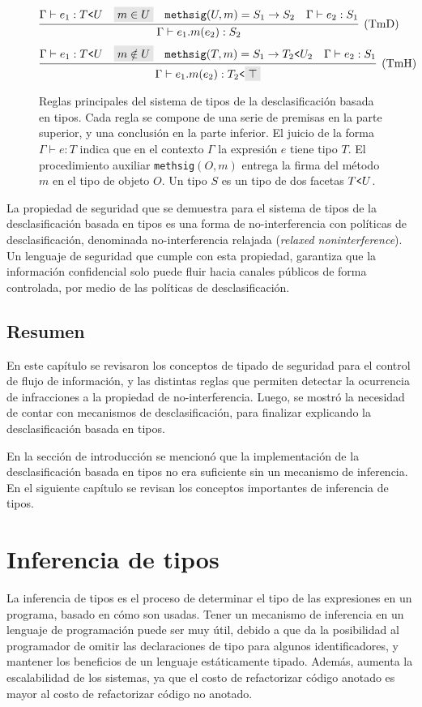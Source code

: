 \begin{figure}[ht]
  \centering
  \[
    \infer[(\text{TmD})]
    {\Gamma \vdash e_1.m(e_2) : S_2}
    {
    \Gamma \vdash e_1 : T\text{\texttt{<}}U&
    \highlight{m\in U}&
    \mathtt{methsig}(U,m) = S_1 \rightarrow S_2&
    \Gamma \vdash e_2 : S_1
    }
  \]
  \[
    \infer[(\text{TmH})]
    {\Gamma \vdash e_1.m(e_2) : T_2\text{\texttt{<}}\highlight{\top}}
    {
    \Gamma \vdash e_1 : T\text{\texttt{<}}U&
    \highlight{m\notin U}&
    \mathtt{methsig}(T,m) = S_1 \rightarrow T_2\text{\texttt{<}}U_2&
    \Gamma \vdash e_2 : S_1
    }
  \]
  \caption{Reglas principales del sistema de tipos de la desclasificación basada en tipos. Cada regla se compone de una serie de premisas en la parte superior, y una conclusión en la parte inferior. El juicio de la forma $\Gamma \vdash e : T$ indica que en el contexto $\Gamma$ la expresión $e$ tiene tipo $T$. El procedimiento auxiliar \texttt{methsig}$(O,m)$ entrega la firma del método $m$ en el tipo de objeto $O$. Un tipo $S$ es un tipo de dos facetas $T\text{\texttt{<}}U$.}
  \label{reglas}
\end{figure}

La propiedad de seguridad que se demuestra para el sistema de tipos de la desclasificación basada en tipos es una forma de no-interferencia con políticas de desclasificación, denominada no-interferencia relajada (\emph{relaxed noninterference}). Un lenguaje de seguridad que cumple con esta propiedad, garantiza que la información confidencial solo puede fluir hacia canales públicos de forma controlada, por medio de las políticas de desclasificación.

\section*{Resumen}
En este capítulo se revisaron los conceptos de tipado de seguridad para el control de flujo de información, y las distintas reglas que permiten detectar la ocurrencia de infracciones a la propiedad de no-interferencia. Luego, se mostró la necesidad de contar con mecanismos de desclasificación, para finalizar explicando la desclasificación basada en tipos.

En la sección de introducción se mencionó que la implementación de la desclasificación basada en tipos no era suficiente sin un mecanismo de inferencia. En el siguiente capítulo se revisan los conceptos importantes de inferencia de tipos.

\chapter{Inferencia de tipos} \label{inference}
La inferencia de tipos es el proceso de determinar el tipo de las expresiones en un programa, basado en cómo son usadas. Tener un mecanismo de inferencia en un lenguaje de programación puede ser muy útil, debido a que da la posibilidad al programador de omitir las declaraciones de tipo para algunos identificadores, y mantener los beneficios de un lenguaje estáticamente tipado. Además, aumenta la escalabilidad de los sistemas, ya que el costo de refactorizar código anotado es mayor al costo de refactorizar código no anotado.

